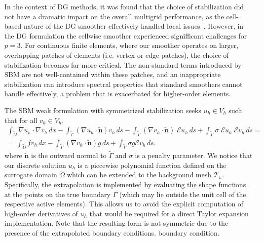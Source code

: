 \documentclass{elsarticle}
\begin{document}
In the context of DG methods, it was found that the choice of stabilization did not have a dramatic impact on the
overall multigrid performance, as the cell-based nature of the DG smoother effectively handled local
issues~\cite{wichrowski2025geometric}. However, in the DG formulation the cellwise smoother experienced signifficant
challenges for $p=3$. For continuous finite elements, where our smoother operates on larger, overlapping patches of
elements (i.e. vertex or edge patches), the choice of stabilization becomes far more critical. The non-standard terms
introduced by SBM are not well-contained within these patches, and an inappropriate stabilization can introduce
spectral properties that standard smoothers cannot handle effectively, a problem that is exacerbated for higher-order
elements.

The SBM weak formulation with symmetrized stabilization seeks $u_h \in V_h$ such that for all $v_h \in V_h$,
\begin{equation}
    \begin{split}
        \int_{\tilde{\Omega}} \nabla u_h \cdot \nabla v_h \, dx
        - \int_{\tilde{\Gamma}} (\nabla u_h \cdot \tilde{\mathbf{n}}) v_h \, ds
        -  \int_{\tilde{\Gamma}} (\nabla v_h \cdot \tilde{\mathbf{n}}) \; \mathcal{E}u_h \, ds
        + \int_{\tilde{\Gamma}} \sigma \; \mathcal{E} u_h  \; \mathcal{E} v_h \, ds = \\
        = \int_{\tilde{\Omega}} f v_h \, dx
        - \int_{\tilde{\Gamma}} (\nabla v_h \cdot \tilde{\mathbf{n}}) {g} \, ds
        + \int_{\tilde{\Gamma}} \sigma g \mathcal{E} v_h \, ds.
    \end{split}
\end{equation}
where $\tilde{\mathbf{n}}$ is the outward normal to $\tilde{\Gamma}$ and $\sigma$ is a penalty parameter.
We notice that our discrete solution $u_h$ is a piecewise polynomial function defined on the
surrogate domain $\tilde{\Omega}$ which can be extended to the background mesh $\mathcal{T}_h$. Specifically, the extrapolation is implemented by evaluating the shape functions at the points on the true boundary $\Gamma$ (which may lie outside the unit cell of the respective active elements). This allows us to avoid the explicit computation of high-order
derivatives of $u_h$ that would be required for a direct Taylor expansion implementation. Note that the resulting form is not symmetric due to the presence of the extrapolated boundary conditions.
boundary condition.
\end{document}
